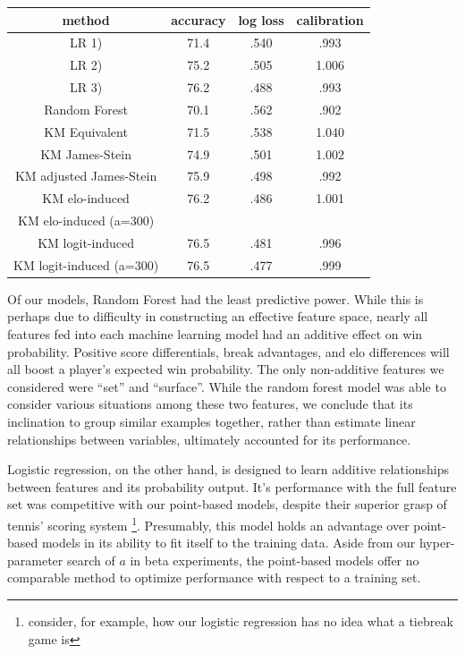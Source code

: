 \documentclass[chapterprefix=false]{report}
\begin{document}
\begin{center}
\begin{tabular}{ |c|c|c|c| } 
 \hline
 method & accuracy & log loss & calibration
   \\ 
 \hline
  LR 1) & 71.4 & .540 & .993
  \\ 
 \hline
  LR 2) & 75.2 & .505 & 1.006
  \\ 
 \hline
 LR 3) & 76.2 & .488 & .993
  \\ 
 \hline
 Random Forest & 70.1 & .562 & .902
  \\ 
 \hline
 KM Equivalent & 71.5 & .538 & 1.040
  \\ 
 \hline
 KM James-Stein & 74.9 & .501 & 1.002
  \\ 
 \hline
 KM adjusted James-Stein & 75.9 & .498 & .992
  \\ 
 \hline
 KM elo-induced & 76.2 & .486 & 1.001
  \\ 
 \hline
  KM elo-induced (a=300) &  & &
  \\ 
 \hline
  KM logit-induced & 76.5 & .481 & .996
  \\ 
 \hline
 KM logit-induced (a=300) & 76.5 & .477 & .999
  \\ 
 \hline
\end{tabular}
\end{center}

Of our models, Random Forest had the least predictive power. While this is perhaps due to difficulty in constructing an effective feature space, nearly all features fed into each machine learning model had an additive effect on win probability. Positive score differentials, break advantages, and elo differences will all boost a player's expected win probability. The only non-additive features we considered were ``set'' and ``surface''. While the random forest model was able to consider various situations among these two features, we conclude that its inclination to group similar examples together, rather than estimate linear relationships between variables, ultimately accounted for its performance.

Logistic regression, on the other hand, is designed to  learn additive relationships between features and its probability output. It's performance with the full feature set was competitive with our point-based models, despite their superior grasp of tennis' scoring system \footnote{consider, for example, how our logistic regression has no idea what a tiebreak game is}. Presumably, this model holds an advantage over point-based models in its ability to fit itself to the training data. Aside from our hyper-parameter search of $a$ in beta experiments, the point-based models offer no comparable method to optimize performance with respect to a training set.
\end{document}
